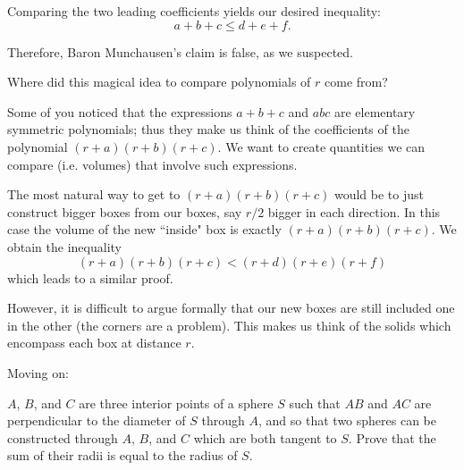 Comparing the two leading coefficients yields our desired inequality:
$$a + b + c \le d + e + f.$$

Therefore, Baron Munchausen's claim is false, as we suspected.

Where did this magical idea to compare polynomials of $r$ come from?





Some of you noticed that the expressions $a+b+c$ and $abc$ are elementary symmetric polynomials; thus they make us think of the coefficients of the polynomial $(r+a)(r+b)(r+c)$. We want to create quantities we can compare (i.e. volumes) that involve such expressions.

The most natural way to get to $(r+a)(r+b)(r+c)$ would be to just construct bigger boxes from our boxes, say $r/2$ bigger in each direction. In this case the volume of the new ``inside" box is exactly $(r+a)(r+b)(r+c)$. We obtain the inequality $$(r+a)(r+b)(r+c)<(r+d)(r+e)(r+f)$$ which leads to a similar proof.

However, it is difficult to argue formally that our new boxes are still included one in the other (the corners are a problem). This makes us think of the solids which encompass each box at distance $r$.

Moving on:

\begin{example}
$A$, $B$, and $C$ are three interior points of a sphere $S$ such that $AB$ and $AC$ are perpendicular to the diameter of $S$ through $A$, and so that two spheres can be constructed through $A$, $B$, and $C$ which are both tangent to $S$. Prove that the sum of their radii is equal to the radius of $S$.
    
\end{example}

